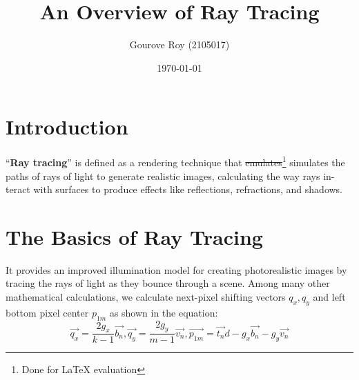 \documentclass{article}
\title{An Overview of Ray Tracing}
\author{Gourove Roy (2105017)}
\date{\today}
\begin{document}
\maketitle
\section{Introduction}
“\textbf{Ray tracing}” is defined as a rendering technique that \sout{emulates}\footnote{Done for \LaTeX{} evaluation} simulates the
paths of rays of light to generate realistic images, calculating the way rays in-
teract with surfaces to produce effects like reflections, refractions, and shadows.
\cite{whitted1979improved}

\section{The Basics of Ray Tracing}
It provides an improved illumination model for creating photorealistic images
by tracing the rays of light as they bounce through a scene. Among many other
mathematical calculations, we calculate next-pixel shifting vectors $q_x, q_y$ and
left bottom pixel center $p_{1m}$ as shown in the equation:
\begin{equation*}
    \vec{q_x} = \frac{2g_x}{k - 1}\vec{b_n}, \vec{q_y} = \frac{2g_y}{m - 1}\vec{v_n}, \vec{p_{1m}} = \vec{t_n}d - {g_x}\vec{b_n} - {g_y}\vec{v_n}
\end{equation*}
\end{document}
